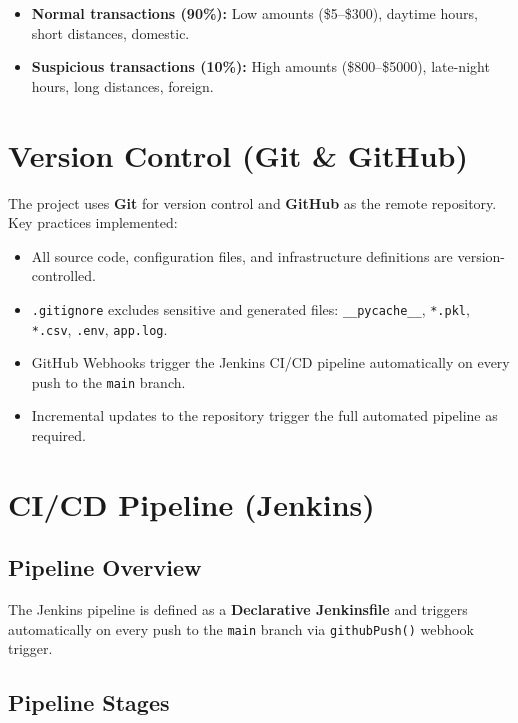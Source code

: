 \documentclass[12pt,a4paper]{article}
\begin{document}
\begin{itemize}
    \item \textbf{Normal transactions (90\%):} Low amounts (\$5--\$300), daytime hours, short distances, domestic.
    \item \textbf{Suspicious transactions (10\%):} High amounts (\$800--\$5000), late-night hours, long distances, foreign.
\end{itemize}

\section{Version Control (Git \& GitHub)}

The project uses \textbf{Git} for version control and \textbf{GitHub} as the remote repository. Key practices implemented:

\begin{itemize}
    \item All source code, configuration files, and infrastructure definitions are version-controlled.
    \item \texttt{.gitignore} excludes sensitive and generated files: \texttt{\_\_pycache\_\_}, \texttt{*.pkl}, \texttt{*.csv}, \texttt{.env}, \texttt{app.log}.
    \item GitHub Webhooks trigger the Jenkins CI/CD pipeline automatically on every push to the \texttt{main} branch.
    \item Incremental updates to the repository trigger the full automated pipeline as required.
\end{itemize}

\section{CI/CD Pipeline (Jenkins)}

\subsection{Pipeline Overview}

The Jenkins pipeline is defined as a \textbf{Declarative Jenkinsfile} and triggers automatically on every push to the \texttt{main} branch via \texttt{githubPush()} webhook trigger.

\subsection{Pipeline Stages}
\end{document}
